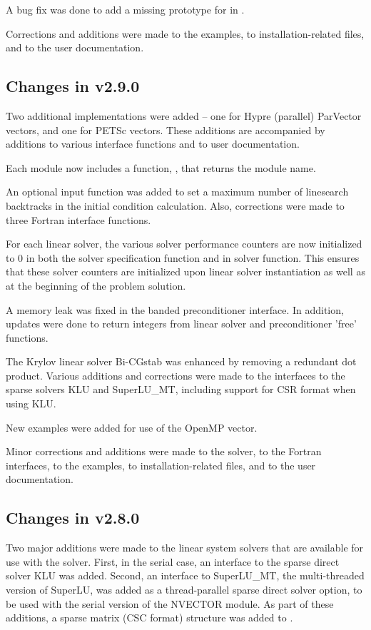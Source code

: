 A bug fix was done to add a missing prototype for  
in .
 
Corrections and additions were made to the examples, 
to installation-related files,
and to the user documentation.


\subsection*{Changes in v2.9.0}

Two additional {\nvector} implementations were added -- one for
Hypre (parallel) ParVector vectors, and one for PETSc vectors.  These
additions are accompanied by additions to various interface functions
and to user documentation.

Each {\nvector} module now includes a function, ,
that returns the {\nvector} module name.

An optional input function was added to set a maximum
number of linesearch backtracks in the initial condition calculation.
Also, corrections were made to three Fortran interface functions.

For each linear solver, the various solver performance counters are
now initialized to 0 in both the solver specification function and in
solver  function.  This ensures that these solver counters
are initialized upon linear solver instantiation as well as at the
beginning of the problem solution.

A memory leak was fixed in the banded preconditioner interface.
In addition, updates were done to return integers from linear solver 
and preconditioner 'free' functions.

The Krylov linear solver Bi-CGstab was enhanced by removing a redundant
dot product.  Various additions and corrections were made to the
interfaces to the sparse solvers KLU and SuperLU\_MT, including support
for CSR format when using KLU.

New examples were added for use of the OpenMP vector.

Minor corrections and additions were made to the {\ida} solver, to the
Fortran interfaces, to the examples, to installation-related files,
and to the user documentation.

\subsection*{Changes in v2.8.0}

Two major additions were made to the linear system solvers that are
available for use with the {\ida} solver.  First, in the serial case,
an interface to the sparse direct solver KLU was added.
Second, an interface to SuperLU\_MT, the multi-threaded version of
SuperLU, was added as a thread-parallel sparse direct solver option,
to be used with the serial version of the NVECTOR module.
As part of these additions, a sparse matrix (CSC format) structure 
was added to {\ida}.

